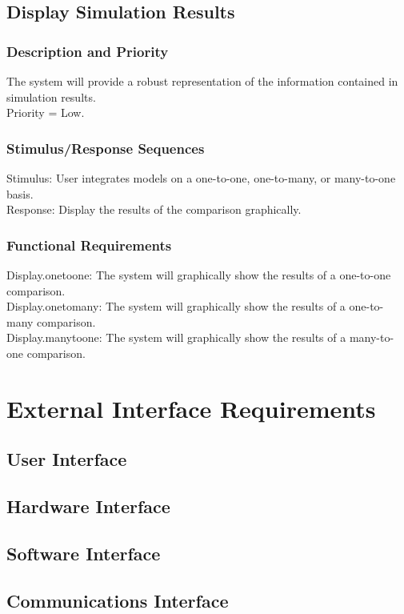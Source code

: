 \documentclass{article}
\begin{document}
\subsection{Display Simulation Results}
\subsubsection{Description and Priority}
The system will provide a robust representation of the information contained in simulation results.\\
Priority = Low.

\subsubsection{Stimulus/Response Sequences}
Stimulus: User integrates models on a one-to-one, one-to-many, or many-to-one basis.\\
Response: Display the results of the comparison graphically.

\subsubsection{Functional Requirements}
Display.onetoone: The system will graphically show the results of a one-to-one comparison.\\
Display.onetomany: The system will graphically show the results of a one-to-many comparison.\\
Display.manytoone: The system will graphically show the results of a many-to-one comparison.

\section{External Interface Requirements}
\subsection{User Interface}
\subsection{Hardware Interface}
\subsection{Software Interface}
\subsection{Communications Interface}
\end{document}

